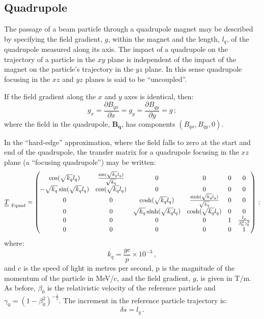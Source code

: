 \subsection{Quadrupole}

The passage of a beam particle through a quadrupole magnet may be
described by specifying the field gradient, $g$, within the magnet and
the length, $l_q$, of the quadrupole measured along its axis.
The impact of a quadrupole on the trajectory of a particle in the $xy$
plane is independent of the impact of the magnet on the particle's
trajectory in the $yz$ plane.   
In this sense quadrupole focusing in the $xz$ and $yz$ planes is said
to be ``uncoupled''. 

If the field gradient along the $x$ and $y$ axes is identical, then:
\begin{equation}
  g_x = \frac{\partial B_{qx}}{\partial x} =
  g_y = \frac{\partial B_{qy}}{\partial y} = g \, ; 
\end{equation}
where the field in the quadrupole, $\bm{B_q}$, has components
$(B_{qx}, B_{qy}, 0)$.

In the ``hard-edge'' approximation, where the field falls to zero at
the start and end of the quadrupole, the transfer matrix for a
quadrupole focusing in the $xz$ plane (a ``focusing quadrupole'') may
be written: 
\begin{equation}
  \underline{\underline{T}}_{\rm~Fquad} =
    \begin{pmatrix}
          \cos(\sqrt{k_q} l_q) & \frac{\sin(\sqrt{k_q} l_q)}{\sqrt{k_q}} & 0 & 0             & 0 & 0 \\
-\sqrt{k_q} \sin(\sqrt{k_q} l_q) &                  \cos(\sqrt{k_q} l_q) & 0 & 0             & 0 & 0 \\
          0 & 0 &           \cosh(\sqrt{k_q} l_q) & \frac{\sinh(\sqrt{k_q} l_q)}{\sqrt{k_q}} & 0 & 0 \\
          0 & 0 &  \sqrt{k_q} \sinh(\sqrt{k_q} l_q) &                  \cosh(\sqrt{k_q} l_q) & 0 & 0 \\
          0 & 0 & 0 & 0 & 1 & \frac{l_q}{\beta_0^2 \gamma_0^2} \\
          0 & 0 & 0 & 0 & 0 &                             1
        \end{pmatrix} \, ; 
\end{equation}
where:
\begin{equation}
  k_q = \frac{gc}{p} \times 10^{-3} \, ,  \label{Eq:Effectivekq}
\end{equation}
and $c$ is the speed of light in metres per second, p is the magnitude
of the momentum of the particle in MeV/c, and the field gradient, $g$,
is given in T/m.
As before, $\beta_0$ is the relativistic velocity of the reference
particle and $\gamma_0=(1-\beta_0^2)^{-\frac{1}{2}}$.
The increment in the reference particle trajectory is:
\begin{equation}
  \delta s = l_q \, .
\end{equation}

